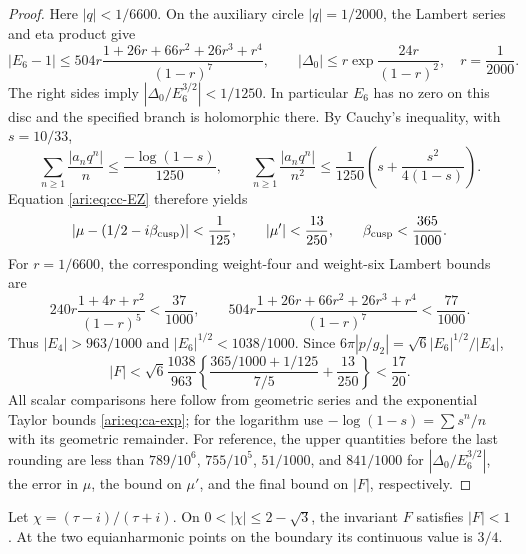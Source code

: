 \begin{proof}
Here $|q|<1/6600$. On the auxiliary circle $|q|=1/2000$,
the Lambert series and eta product give
\[
 |E_6-1|\le
 504r\frac{1+26r+66r^2+26r^3+r^4}{(1-r)^7},\qquad
 |\Delta_0|\le r\exp\!\frac{24r}{(1-r)^2},
 \quad r=\frac1{2000}.
\]
The right sides imply $|\Delta_0/E_6^{3/2}|<1/1250$.
In particular $E_6$ has no zero on this disc and the specified
branch is holomorphic there. By Cauchy's inequality, with
$s=10/33$,
\[
 \sum_{n\ge1}\frac{|a_nq^n|}{n}
 \le\frac{-\log(1-s)}{1250},\qquad
 \sum_{n\ge1}\frac{|a_nq^n|}{n^2}
 \le\frac1{1250}\left(s+\frac{s^2}{4(1-s)}\right).
\]
Equation \eqref{ari:eq:cc-EZ} therefore yields
\[
 |\mu-(1/2-i\beta_{\rm cusp})|<\frac1{125},\qquad
 |\mu'|<\frac{13}{250},\qquad \beta_{\rm cusp}<\frac{365}{1000}.
\]
For $r=1/6600$, the corresponding weight-four and weight-six
Lambert bounds are
\[
 240r\frac{1+4r+r^2}{(1-r)^5}<\frac{37}{1000},\qquad
 504r\frac{1+26r+66r^2+26r^3+r^4}{(1-r)^7}
       <\frac{77}{1000}.
\]
Thus $|E_4|>963/1000$ and $|E_6|^{1/2}<1038/1000$.
Since $6\pi|p/g_2|=\sqrt6|E_6|^{1/2}/|E_4|$,
\begin{equation}\label{ari:eq:cc-cuspbound}
 |F|<\sqrt6\frac{1038}{963}
 \left\{\frac{365/1000+1/125}{7/5}+\frac{13}{250}\right\}
 <\frac{17}{20}.
\end{equation}
All scalar comparisons here follow from geometric series and
the exponential Taylor bounds \eqref{ari:eq:ca-exp}; for the logarithm
use $-\log(1-s)=\sum s^n/n$ with its geometric remainder.
For reference, the upper quantities before the last rounding are
less than $789/10^6$, $755/10^5$, $51/1000$, and $841/1000$
for $|\Delta_0/E_6^{3/2}|$, the error in $\mu$, the bound on
$\mu'$, and the final bound on $|F|$, respectively.
\end{proof}

\begin{proposition}\label{ari:C.8.14}
Let $\chi=(\tau-i)/(\tau+i)$. On
$0<|\chi|\le2-\sqrt3$, the invariant $F$ satisfies $|F|<1$.
At the two equianharmonic points on the boundary its continuous
value is $3/4$.
\end{proposition}

